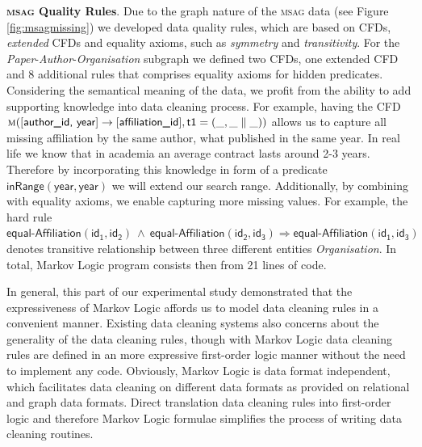 \textbf{\textsc{msag} Quality Rules}.  
Due to the graph nature of the \textsc{msag} data (see Figure \ref{fig:msagmissing}) we developed data quality rules, which are based on CFDs, \textit{extended} CFDs \cite{Chen2009extended} and equality axioms, such as \textit{symmetry} and \textit{transitivity}. For the \textit{Paper}-\textit{Author}-\textit{Organisation} subgraph we defined two CFDs, one extended CFD and 8 additional rules that comprises equality axioms for hidden predicates. Considering the semantical meaning of the data, we profit from the ability to add supporting knowledge into data cleaning process. For example, having the CFD$\mathsf{\textsc{m}([\textsf{author\_id, year}] \rightarrow [\textsf{affiliation\_id}],t1=(\_,\_ \parallel \_))} $  allows us to capture all missing affiliation by the same author, what published in the same year. In real life we know that in academia an average contract lasts around 2-3 years. Therefore by incorporating this knowledge in form of a predicate $\mathsf{\textsf{inRange}(year, year)}$ we will extend our search range. Additionally, by combining with equality axioms, we enable capturing more missing values. For example, the hard rule $\mathsf{\textsf{equal-Affiliation}(id_1, id_2) ~\wedge~ \textsf{equal-Affiliation}(id_2, id_3) \Rightarrow  \textsf{equal-Affiliation}(id_1, id_3)}$ denotes transitive relationship between three different entities \textit{Organisation}. In total, Markov Logic program consists then from 21 lines of code.

In general, this part of our experimental study demonstrated that the expressiveness of Markov Logic affords us to model data cleaning rules in a convenient manner. Existing data cleaning systems \cite{Dallachiesa:2013:NCD:2463676.2465327} also concerns about the generality of the data cleaning rules, though with Markov Logic data cleaning rules are defined in an more expressive first-order logic manner without the need to implement any code.  Obviously, Markov Logic is data format independent, which facilitates data cleaning on different data formats as provided on relational and graph data formats. Direct translation data cleaning rules into first-order logic and therefore Markov Logic formulae simplifies the process of writing data cleaning routines. 


